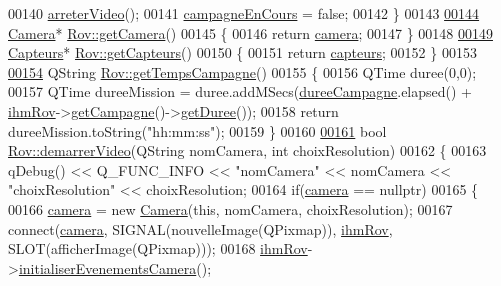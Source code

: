 \begin{DoxyCode}
00140     \hyperlink{class_rov_a241368439666a2549faff42931d82dfb}{arreterVideo}();
00141     \hyperlink{class_rov_abc9d61d10d8fb5e99283d3775baf98a8}{campagneEnCours} = \textcolor{keyword}{false};
00142 \}
00143 
\hyperlink{class_rov_ac1eeb568d39018359b89384c2ee6ee86}{00144} \hyperlink{class_camera}{Camera}* \hyperlink{class_rov_ac1eeb568d39018359b89384c2ee6ee86}{Rov::getCamera}()
00145 \{
00146     \textcolor{keywordflow}{return} \hyperlink{class_rov_ad0461ecece812497ee9b4a962f168c18}{camera};
00147 \}
00148 
\hyperlink{class_rov_a7e231245b39e7cc8026324e337b34c64}{00149} \hyperlink{class_capteurs}{Capteurs}* \hyperlink{class_rov_a7e231245b39e7cc8026324e337b34c64}{Rov::getCapteurs}()
00150 \{
00151     \textcolor{keywordflow}{return} \hyperlink{class_rov_a1b34d63d505da660be27b75ad93754c3}{capteurs};
00152 \}
00153 
\hyperlink{class_rov_aa977585d4377a57281004fd57208635a}{00154} QString \hyperlink{class_rov_aa977585d4377a57281004fd57208635a}{Rov::getTempsCampagne}()
00155 \{
00156     QTime duree(0,0);
00157     QTime dureeMission = duree.addMSecs(\hyperlink{class_rov_a148a0ff28fc2dbed7b65466d77297b8a}{dureeCampagne}.elapsed() + 
      \hyperlink{class_rov_a9b1c1c3b4e268a32e69b2ea4c863b817}{ihmRov}->\hyperlink{class_i_h_m_rov_ab3e8686eef9233b4c1e6711cf1c4576a}{getCampagne}()->\hyperlink{class_campagne_abe02a9050f4a5ea9521dd40b855c350b}{getDuree}());
00158     \textcolor{keywordflow}{return} dureeMission.toString(\textcolor{stringliteral}{"hh:mm:ss"});
00159 \}
00160 
\hyperlink{class_rov_aaf1a53557b6e8f0ae2497a0af93bd6db}{00161} \textcolor{keywordtype}{bool} \hyperlink{class_rov_aaf1a53557b6e8f0ae2497a0af93bd6db}{Rov::demarrerVideo}(QString nomCamera, \textcolor{keywordtype}{int} choixResolution)
00162 \{
00163     qDebug() << Q\_FUNC\_INFO << \textcolor{stringliteral}{"nomCamera"} << nomCamera << \textcolor{stringliteral}{"choixResolution"} << choixResolution;
00164     \textcolor{keywordflow}{if}(\hyperlink{class_rov_ad0461ecece812497ee9b4a962f168c18}{camera} == \textcolor{keyword}{nullptr})
00165     \{
00166         \hyperlink{class_rov_ad0461ecece812497ee9b4a962f168c18}{camera} = \textcolor{keyword}{new} \hyperlink{class_camera}{Camera}(\textcolor{keyword}{this}, nomCamera, choixResolution);
00167         connect(\hyperlink{class_rov_ad0461ecece812497ee9b4a962f168c18}{camera}, SIGNAL(nouvelleImage(QPixmap)), \hyperlink{class_rov_a9b1c1c3b4e268a32e69b2ea4c863b817}{ihmRov}, SLOT(afficherImage(QPixmap)));
00168         \hyperlink{class_rov_a9b1c1c3b4e268a32e69b2ea4c863b817}{ihmRov}->\hyperlink{class_i_h_m_rov_a955daa231d959666fa7ed01346b2b6ef}{initialiserEvenementsCamera}();

\end{DoxyCode}
